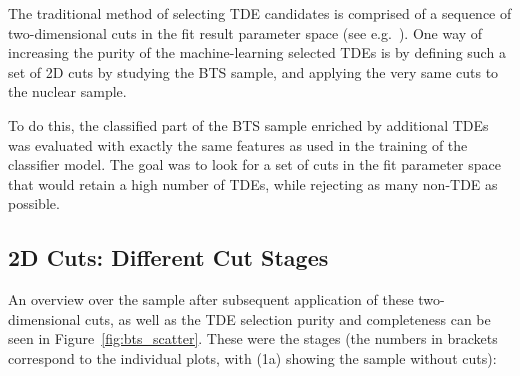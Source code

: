 The traditional method of selecting TDE candidates is comprised of a sequence of two-dimensional cuts in the fit result parameter space (see e.g.~\cite{Velzen2019}). One way of increasing the purity of the machine-learning selected TDEs is by defining such a set of 2D cuts by studying the BTS sample, and applying the very same cuts to the nuclear sample.

To do this, the classified part of the BTS sample enriched by additional TDEs was evaluated with exactly the same features as used in the training of the classifier model. The goal was to look for a set of cuts in the fit parameter space that would retain a high number of TDEs, while rejecting as many non-TDE as possible.

\subsection{2D Cuts: Different Cut Stages}
An overview over the sample after subsequent application of these two-dimensional cuts, as well as the TDE selection purity and completeness can be seen in Figure~\ref{fig:bts_scatter}. These were the stages (the numbers in brackets correspond to the individual plots, with (1a) showing the sample without cuts):

